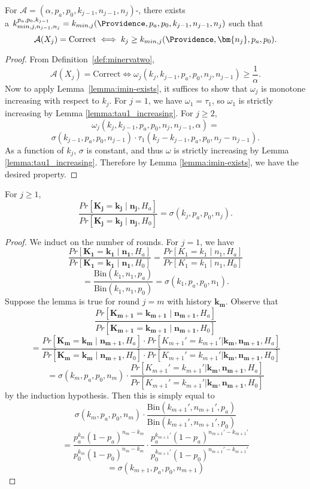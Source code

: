 \begin{lemma}
    \label{lemma:minerva2_kmin_exists}
    For $\mathcal{A}=(\alpha,p_a, p_0,k_{j-1},n_{j-1},n_j)$-\Providence, there exists\\ a 
    $k_{min, j, n_{j-1}, n_j}^{p_a, p_0, k_{j-1}} = 
    k_{min,j}(\Providence, p_a, p_0, k_{j-1}, n_{j-1}, n_j)$ such that $$\mathcal{A}(X_j)=\text{Correct}\iff k_j\ge k_{min,j}(\Providence,  \bm{n_j}, p_a, p_0).$$
\end{lemma}
\begin{proof}
    From Definition~\ref{def:minervatwo}, $$\mathcal{A}(X_j)=\text{Correct}\iff \omega_j(k_{j}, k_{j-1}, p_a, p_0, n_j, n_{j-1}) \ge \frac{1}{\alpha}.$$
    Now to apply Lemma~\ref{lemma:imin-exists}, it suffices to show that
    $\omega_j$ is monotone increasing with respect to $k_j$.
    For $j=1$, we have $\omega_1=\tau_1$, so $\omega_1$ is strictly increasing by Lemma \ref{lemma:tau1_increasing}. For $j\ge 2$,
    $$\omega_j(k_j,k_{j-1},p_a,p_0,n_j,n_{j-1},\alpha)=$$$$\sigma(k_{j-1},p_a,p_0,n_{j-1})\cdot \tau_1(k_{j}-k_{j-1},p_a,p_0,n_j-n_{j-1}).$$
    As a function of $k_j$, $\sigma$ is constant, and thus $\omega$ is strictly increasing by Lemma \ref{lemma:tau1_increasing}. Therefore by Lemma \ref{lemma:imin-exists}, we have the desired property.
\end{proof}

\begin{lemma}
\label{lemma:any_ratio_is_sigma_simple}
For $j\ge 1$,
$$\frac{Pr[\bm{K_j}=\bm{k_j} \mid \bm{n_j}, H_a]}{Pr[\bm{K_j}=\bm{k_j} \mid \bm{n_j}, H_0]} = \sigma(k_j, p_a, p_0, n_j).$$
\end{lemma}
\begin{proof}
We induct on the number of rounds.
For $j=1$, we have
$$\frac{Pr[\bm{K_1}=\bm{k_1} \mid \bm{n_1},H_a]}{Pr[\bm{K_1}=\bm{k_1} \mid  \bm{n_1},H_0]} =\frac{Pr[K_1 = k_{1} \mid n_1,H_a]}{Pr[K_1 = k_1 \mid n_1,H_0]} $$$$= \frac{\text{Bin}(k_1,n_1,p_a)}{\text{Bin}(k_1,n_1,p_0)}=\sigma(k_1, p_a, p_0, n_1).$$
Suppose the lemma is true for round $j=m$ with history $\bm{k_m}$.
Observe that
 $$\frac{Pr[\bm{K_{m+1}}=\bm{k_{m+1}} \mid \bm{n_{m+1}},H_a]}{Pr[\bm{K_{m+1}}=\bm{k_{m+1}} \mid \bm{n_{m+1}}, H_0]} $$$$= \frac{ Pr[\bm{K_{m}}=\bm{k_{m}}\mid \bm{n_{m+1}},H_a] \cdot Pr[K_{m+1}'=k_{m+1}'|\bm{k_m},\bm{n_{m+1}},H_a]}{ Pr[\bm{K_{m}}= \bm{k_{m}} \mid  \bm{n_{m+1}},H_0]  \cdot  Pr[K_{m+1}'=k_{m+1}'|\bm{k_m},\bm{n_{m+1}},H_0]  }$$
 $$=\sigma(k_m, p_a, p_0, n_m) \cdot \frac{Pr[K_{m+1}'=k_{m+1}'|\bm{k_m}, \bm{n_{m+1}}, H_a]}{Pr[K_{m+1}'=k_{m+1}'|\bm{k_m},\bm{n_{m+1}},H_0]}$$
 by the induction hypothesis.
Then this is simply equal to
 $$\sigma(k_m, p_a, p_0, n_m)\cdot\frac{\text{Bin}(k_{m+1}',n_{m+1}',p_a)}{\text{Bin}(k_{m+1}',n_{m+1}',p_0)}
 $$$$
 =\frac{p_a^{k_m} (1-p_a)^{n_m-k_m}}{p_0^{k_m} (1-p_0)^{n_m-k_m}} \cdot
 \frac{p_a^{k_{m+1}'} (1-p_a)^{n_{m+1}'-k_{m+1}'}}{p_0^{k_{m+1}'} (1-p_0)^{n_{m+1}'-k_{m+1}'}}
 $$
 $$
 =\sigma(k_{m+1}, p_a, p_0, n_{m+1})
 $$
\end{proof}


